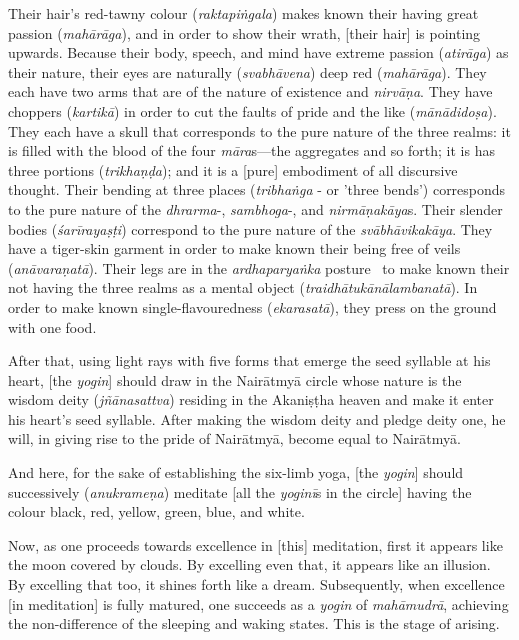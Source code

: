 \documentclass[naipra.tex]{subfiles}
\begin{document}
Their hair's red-tawny colour (\emph{raktapiṅgala}) makes known their having great passion (\emph{mahārāga}), and in order to show their wrath, [their hair] is pointing upwards.
Because their body, speech, and mind have extreme passion (\emph{atirāga}) as their nature, their eyes are naturally (\emph{svabhāvena}) deep red (\emph{mahārāga}).
They each have two arms that are of the nature of existence and \emph{nirvāṇa}.
They have choppers (\emph{kartikā}) in order to cut the faults of pride and the like (\emph{mānādidoṣa}).
They each have a skull that corresponds to the pure nature of the three realms: it is filled with the blood of the four \emph{māra}s—the aggregates and so forth; it is has three portions (\emph{trikhaṇḍa}); and it is a [pure] embodiment of all discursive thought.
Their bending at three places (\emph{tribhaṅga} - or 'three bends') corresponds to the pure nature of the \emph{dhrarma}-, \emph{sambhoga}-, and \emph{nirmāṇakāya}s.
Their slender bodies (\emph{śarīrayaṣṭi}) correspond to the pure nature of the \emph{svābhāvikakāya}.
They have a tiger-skin garment in order to make known their being free of veils (\emph{anāvaraṇatā}).
Their legs are \crux in the \emph{ardhaparyaṅka} posture \crux\ to make known their not having the three realms as a mental object (\emph{traidhātukānālambanatā}).
In order to make known single-flavouredness (\emph{ekarasatā}), they press on the ground with one food.

After that, using light rays with five forms that emerge the seed syllable at his heart, [the \emph{yogin}] should draw in the Nairātmyā circle whose nature is the wisdom deity (\emph{jñānasattva}) residing in the Akaniṣṭha heaven and make it enter his heart's seed syllable.
After making the wisdom deity and pledge deity one, he will, in giving rise to the pride of Nairātmyā, become equal to Nairātmyā.

And here, for the sake of establishing the six-limb yoga, [the \emph{yogin}] should successively (\emph{anukrameṇa}) meditate [all the \emph{yoginī}s in the circle] having the colour black, red, yellow, green, blue, and white.

Now, as one proceeds towards excellence in [this] meditation, first it appears like the moon covered by clouds.
By excelling even that, it appears like an illusion.
By excelling that too, it shines forth like a dream.
Subsequently, when excellence [in meditation] is fully matured, one succeeds as a \emph{yogin} of \emph{mahāmudrā}, achieving the non-difference of the sleeping and waking states.
This is the stage of arising.
\end{document}
